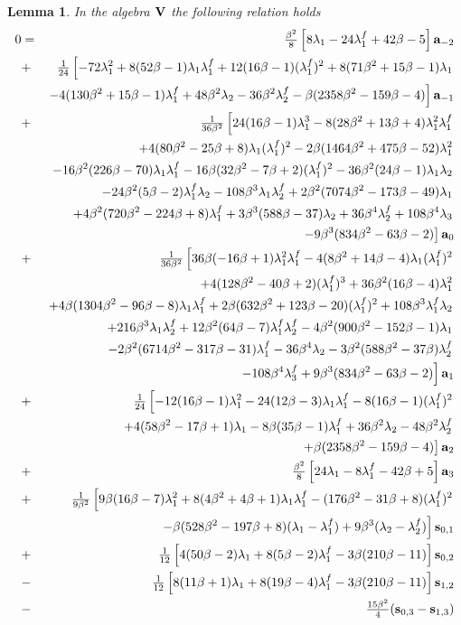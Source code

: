 \documentclass[a4paper]{amsart}
\newtheorem{lemma}{Lemma}[section]
\newcommand{\Vo}{{\bf V}}
\newcommand{\lm}{\lambda}
\newcommand{\lmu}{\lambda_1}
\newcommand{\lmf}{\lambda_1^f}
\newcommand{\lmd}{\lambda_2}
\newcommand{\lmdf}{\lambda_2^f}
\newcommand{\lmt}{\lambda_3}
\newcommand{\bt}{\beta}
\newcommand{\ba}{{\bf a}}
\newcommand{\bs}{{\bf s}}
\begin{document}
\begin{lemma}\label{rel3} %
In the algebra $\Vo$ the following relation holds
\begin{eqnarray*}
0&=&
\tfrac{\bt^2}{8}\left [
8\lmu-24\lmf+42\bt-5\right ]\ba_{-2}\\
&+& \tfrac{1}{24}\left [
-72\lmu^2+8(52\bt-1)\lmu\lmf+12(16\bt-1)(\lmf)^2+8(71\bt^2+15\bt-1)\lmu \right .\\
&&\left .
-4(130\bt^2+15\bt-1)\lmf+48\bt^2\lmd
-36\bt^2\lmdf-\bt(2358\bt^2-159\bt-4)\right ] \ba_{-1}\\
&+&\tfrac{1}{36\bt^2}\left [
24(16\bt-1)\lmu^3-8(28\bt^2+13\bt+4)\lmu^2\lmf \right . \\
&& \left . +4(80\bt^2-25\bt+8)\lmu(\lmf)^2-2\bt(1464\bt^2+475\bt-52)\lmu^2 \right . \\
&& \left . -16\bt^2(226\bt-70)\lmu\lmf -16\bt(32\bt^2-7\bt+2)(\lmf)^2-36\bt^2(24\bt-1)\lmu\lmd \right .\\
&& \left . -24\bt^2(5\bt-2)\lmf\lmd-108\bt^3\lmu\lmdf+2\bt^2(7074\bt^2-173\bt-49)\lmu \right . \\
&& \left . +4\bt^2(720\bt^2-224\bt+8)\lmf+3\bt^3(588\bt-37)\lmd+36\bt^4\lmdf+108\bt^4\lmt \right . \\
&& \left .-9\bt^3(834\bt^2-63\bt-2)\right ]\ba_0\\
&+&\tfrac{1}{36\bt^2}\left [
36\bt(-16\bt+1)\lmu^2\lmf-4(8\bt^2+14\bt-4)\lmu(\lmf)^2\right .\\
&& \left . +4(128\bt^2-40\bt+2)(\lmf)^3+36\bt^2(16\bt-4)\lmu^2\right .\\
&& \left . +4\bt(1304\bt^2-96\bt-8)\lmu\lmf +2\bt(632\bt^2+123\bt-20)(\lmf)^2+108\bt^3\lmf\lmd \right . \\
&& \left . +216\bt^3\lmu\lmdf+12\bt^2(64\bt-7)\lmf\lmdf-4\bt^2(900\bt^2-152\bt-1)\lmu\right . \\
&& \left .-2\bt^2(6714\bt^2-317\bt-31)\lmf-36\bt^4\lmd-3\bt^2(588\bt^2-37\bt)\lmdf\right . \\
&& \left .-108\bt^4\lm_3^f+9\bt^3(834\bt^2-63\bt-2)\right ]\ba_1\\
&+&\tfrac{1}{24}\left [
-12(16\bt-1)\lmu^2-24(12\bt-3)\lmu\lmf-8(16\bt-1)(\lmf)^2\right . \\
&&\left . +4(58\bt^2-17\bt+1)\lmu-8\bt(35\bt-1)\lmf+36\bt^2\lmd-48\bt^2\lmdf\right . \\
&& \left . +\bt(2358\bt^2-159\bt-4)\right ]\ba_2\\
&+&\tfrac{\bt^2}{8}\left [24\lmu-8\lmf-42\bt+5 \right ]\ba_3\\
&+&\tfrac{1}{9\bt^2}\left [
9\bt(16\bt-7)\lmu^2+8(4\bt^2+4\bt+1)\lmu\lmf-(176\bt^2-31\bt+8)(\lmf)^2\right . \\
&& \left .-\bt(528\bt^2-197\bt+8)(\lmu-\lmf)+9\bt^3(\lmd-\lmdf )\right ]\bs_{0,1}\\
&+&\tfrac{1}{12}\left [4(50\bt-2)\lmu+8(5\bt-2)\lmf-3\bt(210\bt-11)\right ] \bs_{0,2}\\
&-&\tfrac{1}{12}\left [8(11\bt+1)\lmu+8(19\bt-4)\lmf-3\bt(210\bt-11)\right ]\bs_{1,2}\\
&-&\tfrac{15\bt^2}{4}(\bs_{0,3}-\bs_{1,3})
\end{eqnarray*}
\end{lemma}
\end{document}
